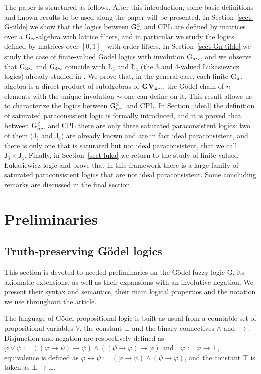 \documentclass{article}
\theoremstyle{definition}
\newcommand{\ninv}{\mathord{\sim}}
\newcommand{\Gsimleq}{\mathrm{G}\mystrut^{\text{\tiny $\leq$}}_{\sim}}
\newcommand{\Gnsimleq}{\mathrm{G}\mystrut^{\text{\tiny $\leq$}}_{n\sim}}
\newcommand\mystrut{\rule{0pt}{7pt}}
\begin{document}
The paper is structured as follows. After this introduction, some basic  definitions and known results to be used along the paper will be presented. In Section~\ref{sect-G-tilde} we show that the logics between $\Gsimleq$ and CPL are defined by matrices over a $\rm{G}_\sim$-algebra with lattice filters, and in particular we study the logics defined by matrices over $[0,1]_\sim$ with order filters. In Section~\ref{sect-Gn-tilde} we study the case of finite-valued G\"odel logics with involution $\rm{G}_{n\sim}$, and we observe that $\rm{G}_{3\sim}$ and $\rm{G}_{4\sim}$ coincide with \L$_3$ and \L$_4$ (the 3 and 4-valued {\L}ukasiewicz logics) already studied in \cite{CoEsGiGo}. We prove that, in the general case, each finite $\rm{G}_{n\sim}$-algebra is a direct product of subalgebras of $\bf GV_{n\sim}$, the G\"odel chain of $n$ elements with the unique involution $\ninv$ one can define on it.
This result allows us to characterize the logics between $\Gnsimleq$ and CPL. In Section~\ref{ideal} the definition of saturated paraconsistent logic is formally introduced, and it is proved that between $\Gnsimleq$ and CPL there are only three saturated paraconsistent logics: two of them ($\mathsf{J}_3$ and $\mathsf{J}_4$) are already known and are in fact ideal paraconsistent, and there is only one that is saturated but not ideal paraconsistent, that we call $\mathsf{J}_3 \times \mathsf{J}_4$. Finally, in Section~\ref{sect-luka} we return to the study of finite-valued {\L}ukasiewicz logic and prove that in this framework there is a large family of saturated paraconsistent logics that are not ideal paraconsistent. Some concluding remarks are discussed in the final section.



\section{Preliminaries}

\subsection{Truth-preserving G\"odel logics} \label{truthpreserving}

This section is devoted to needed preliminaries on the G\"odel fuzzy logic G, its axiomatic extensions, as well as their expansions with an involutive negation. We present their syntax and semantics, their main logical properties and the notation we use throughout the article.

The language of G\"odel propositional logic is built as usual from a countable set of propositional variables $V$, the constant $\bot$
and the binary connectives $\land$ and $\to$. Disjunction and negation are respectively  defined as $\varphi \lor \psi := ((\varphi \to \psi) \to \psi) \land  ((\psi \to \varphi) \to \varphi)$ and $\neg \varphi := \varphi \to \bot$, equivalence is defined as $\varphi \leftrightarrow \psi := (\varphi \to \psi) \wedge (\psi \to \varphi)$, and the constant $\top$ is taken as $\bot \to \bot$.
\end{document}
